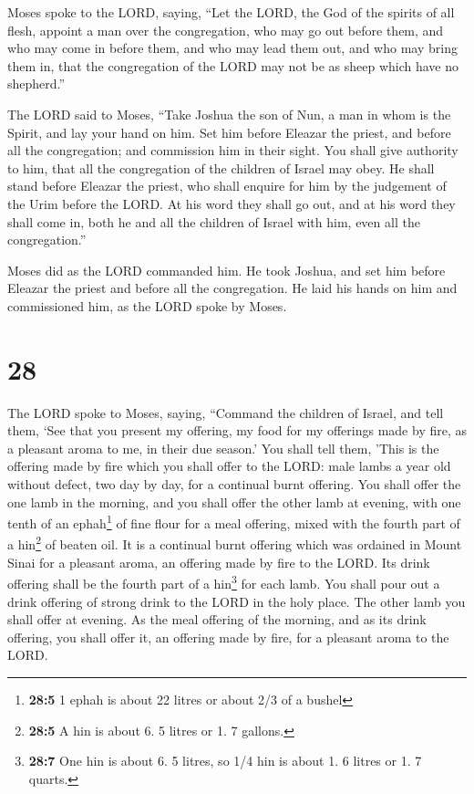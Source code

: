 Moses spoke to the LORD, saying,  ``Let
the LORD, the God of the spirits of all flesh, appoint a man over the
congregation,  who may go out before them, and who may
come in before them, and who may lead them out, and who may bring them
in, that the congregation of the LORD may not be as sheep which have no
shepherd.''

 The LORD said to Moses, ``Take Joshua the son of Nun, a
man in whom is the Spirit, and lay your hand on him.  Set
him before Eleazar the priest, and before all the congregation; and
commission him in their sight.  You shall give authority
to him, that all the congregation of the children of Israel may obey.
 He shall stand before Eleazar the priest, who shall
enquire for him by the judgement of the Urim before the LORD. At his
word they shall go out, and at his word they shall come in, both he and
all the children of Israel with him, even all the congregation.''

 Moses did as the LORD commanded him. He took Joshua, and
set him before Eleazar the priest and before all the congregation.
 He laid his hands on him and commissioned him, as the
LORD spoke by Moses.

\hypertarget{section-27}{%
\section{28}\label{section-27}}

 The LORD spoke to Moses, saying,  ``Command
the children of Israel, and tell them, `See that you present my
offering, my food for my offerings made by fire, as a pleasant aroma to
me, in their due season.'  You shall tell them, 'This is
the offering made by fire which you shall offer to the LORD: male lambs
a year old without defect, two day by day, for a continual burnt
offering.  You shall offer the one lamb in the morning,
and you shall offer the other lamb at evening,  with one
tenth of an ephah\footnote{\textbf{28:5} 1 ephah is about 22 litres or
  about 2/3 of a bushel} of fine flour for a meal offering, mixed with
the fourth part of a hin\footnote{\textbf{28:5} A hin is about 6. 5
  litres or 1. 7 gallons.} of beaten oil.  It is a
continual burnt offering which was ordained in Mount Sinai for a
pleasant aroma, an offering made by fire to the LORD.  Its
drink offering shall be the fourth part of a hin\footnote{\textbf{28:7}
  One hin is about 6. 5 litres, so 1/4 hin is about 1. 6 litres or 1. 7
  quarts.} for each lamb. You shall pour out a drink offering of strong
drink to the LORD in the holy place.  The other lamb you
shall offer at evening. As the meal offering of the morning, and as its
drink offering, you shall offer it, an offering made by fire, for a
pleasant aroma to the LORD.

